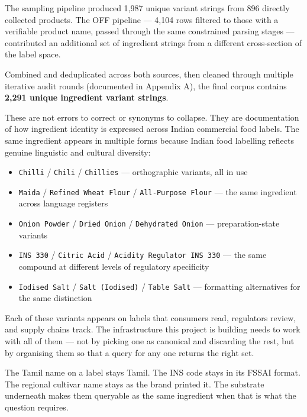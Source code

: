 \documentclass[
  letterpaper,
  DIV=11,
  numbers=noendperiod]{scrartcl}
\providecommand{\tightlist}{%
  \setlength{\itemsep}{0pt}\setlength{\parskip}{0pt}}
\begin{document}
The sampling pipeline produced 1,987 unique variant strings from 896
directly collected products. The OFF pipeline --- 4,104 rows filtered to
those with a verifiable product name, passed through the same
constrained parsing stages --- contributed an additional set of
ingredient strings from a different cross-section of the label space.

Combined and deduplicated across both sources, then cleaned through
multiple iterative audit rounds (documented in Appendix A), the final
corpus contains \textbf{2,291 unique ingredient variant strings}.

These are not errors to correct or synonyms to collapse. They are
documentation of how ingredient identity is expressed across Indian
commercial food labels. The same ingredient appears in multiple forms
because Indian food labelling reflects genuine linguistic and cultural
diversity:

\begin{itemize}
\tightlist
\item
  \texttt{Chilli} / \texttt{Chili} / \texttt{Chillies} --- orthographic
  variants, all in use
\item
  \texttt{Maida} / \texttt{Refined\ Wheat\ Flour} /
  \texttt{All-Purpose\ Flour} --- the same ingredient across language
  registers
\item
  \texttt{Onion\ Powder} / \texttt{Dried\ Onion} /
  \texttt{Dehydrated\ Onion} --- preparation-state variants
\item
  \texttt{INS\ 330} / \texttt{Citric\ Acid} /
  \texttt{Acidity\ Regulator\ INS\ 330} --- the same compound at
  different levels of regulatory specificity
\item
  \texttt{Iodised\ Salt} / \texttt{Salt\ (Iodised)} /
  \texttt{Table\ Salt} --- formatting alternatives for the same
  distinction
\end{itemize}

Each of these variants appears on labels that consumers read, regulators
review, and supply chains track. The infrastructure this project is
building needs to work with all of them --- not by picking one as
canonical and discarding the rest, but by organising them so that a
query for any one returns the right set.

The Tamil name on a label stays Tamil. The INS code stays in its FSSAI
format. The regional cultivar name stays as the brand printed it. The
substrate underneath makes them queryable as the same ingredient when
that is what the question requires.
\end{document}
